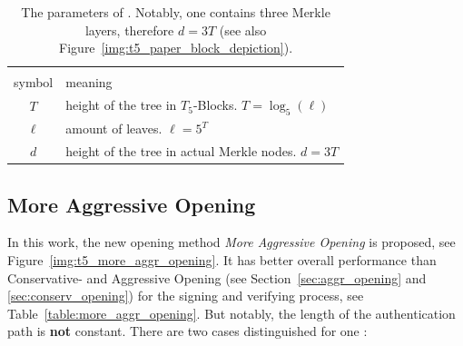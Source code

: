 \begin{table}
\centering
\begin{tabular}{c l}
 \hline\noalign{\smallskip}
 \multicolumn{2}{c}{\textbf{\extree Parameter}} \\
 symbol & meaning \\
 \hline\noalign{\smallskip} 
 $T$ & height of the tree in $T_5$-Blocks. $T = \log_5(\ell)$ \\
  $\ell$ & amount of leaves. $\ell = 5^T$ \\
 $d$ & height of the tree in actual Merkle nodes. $d = 3T$ \\
 \hline
\end{tabular}
\caption{The parameters of \extree. Notably, one \tfblock contains three Merkle layers, therefore $d=3T$ (see also Figure~\ref{img:t5_paper_block_depiction}).} %
\label{table:t5_ext_parameter}
\end{table}

\subsection{More Aggressive Opening}
\label{sec:more_aggr_opening}
In this work, the new opening method \textit{More Aggressive Opening} is proposed, see Figure~\ref{img:t5_more_aggr_opening}. It has better overall performance than Conservative- and Aggressive Opening (see Section~\ref{sec:aggr_opening} and \ref{sec:conserv_opening}) for the signing and verifying process, see Table~\ref{table:more_aggr_opening}. But notably, the length of the authentication path is \textbf{not} constant.
There are two cases distinguished for one \tfblock:

